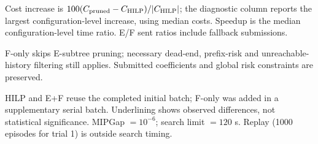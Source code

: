 \documentclass[10pt]{article}
\begin{document}
\noindent\small Cost increase is $100(C_{\rm pruned}-C_{\rm HILP})/|C_{\rm HILP}|$; the diagnostic column reports the largest configuration-level increase, using median costs. Speedup is the median configuration-level time ratio. E/F sent ratios include fallback submissions.\par
\noindent\small F-only skips E-subtree pruning; necessary dead-end, prefix-risk and unreachable-history filtering still applies. Submitted coefficients and global risk constraints are preserved.\par
\noindent\small HILP and E+F reuse the completed initial batch; F-only was added in a supplementary serial batch. Underlining shows observed differences, not statistical significance. MIPGap $=10^{-6}$; search limit $=120$ s. Replay (1000 episodes for trial 1) is outside search timing.\par
\end{document}
